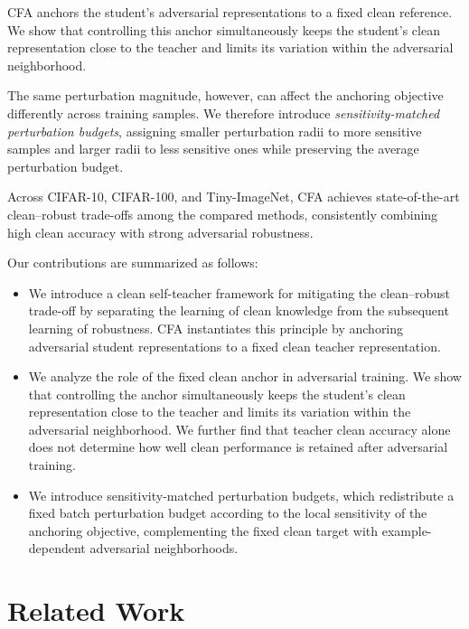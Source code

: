 \documentclass{article} %
\theoremstyle{plain}
\begin{document}
CFA anchors the student's adversarial representations to a fixed clean
reference. We show that controlling this anchor simultaneously keeps the
student's clean representation close to the teacher and limits its variation
within the adversarial neighborhood.

The same perturbation magnitude, however, can affect the anchoring objective
differently across training samples. We therefore introduce
\emph{sensitivity-matched perturbation budgets}, assigning smaller
perturbation radii to more sensitive samples and larger radii to less
sensitive ones while preserving the average perturbation budget.

Across CIFAR-10, CIFAR-100, and Tiny-ImageNet, CFA achieves state-of-the-art
clean--robust trade-offs among the compared methods, consistently combining
high clean accuracy with strong adversarial robustness.

Our contributions are summarized as follows:
\begin{itemize}
  \item We introduce a clean self-teacher framework for mitigating the
  clean--robust trade-off by separating the learning of clean knowledge from
  the subsequent learning of robustness. CFA instantiates this principle by
  anchoring adversarial student representations to a fixed clean teacher
  representation.

  \item We analyze the role of the fixed clean anchor in adversarial training.
  We show that controlling the anchor simultaneously keeps the student's clean
  representation close to the teacher and limits its variation within the
  adversarial neighborhood. We further find that teacher clean accuracy alone
  does not determine how well clean performance is retained after adversarial
  training.

  \item We introduce sensitivity-matched perturbation budgets, which
  redistribute a fixed batch perturbation budget according to the local
  sensitivity of the anchoring objective, complementing the fixed clean target
  with example-dependent adversarial neighborhoods.
\end{itemize}

\section{Related Work}
\label{sec:related}
\end{document}
